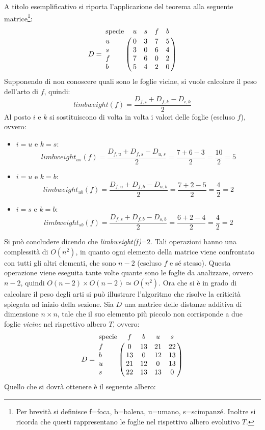 A titolo esemplificativo si riporta l'applicazione del teorema alla seguente matrice\footnote{Per brevità si definisce f=foca, b=balena, u=umano, s=scimpanzé. Inoltre si ricorda che questi rappresentano le foglie nel rispettivo albero evolutivo $T$.}:
\[
D = \bordermatrix{\text{specie}&u&s&f&b\cr
                u& 0 & 3 & 7 & 5\cr
                s& 3 & 0 & 6 & 4\cr
                f& 7 & 6 & 0 & 2\cr
                b& 5 & 4 & 2 & 0}
\]
Supponendo di non conoscere quali sono le foglie vicine, si vuole calcolare il peso dell'arto di $f$, quindi:
\[limbweight(f)=\frac{D_{f,i}+D_{f,k}-D_{i,k}}{2}\]
Al posto $i$ e $k$ si sostituiscono di volta in volta i valori delle foglie (escluso $f$), ovvero:
\begin{itemize}
	\item $i=u$ e $k=s$:
	\[limbweight_{us}(f)=\frac{D_{f,u}+D_{f,s}-D_{u,s}}{2}=\frac{7+6-3}{2}=\frac{10}{2}=5\]
	\item $i=u$ e $k=b$:
	\[limbweight_{ub}(f)=\frac{D_{f,u}+D_{f,b}-D_{u,b}}{2}=\frac{7+2-5}{2}=\frac{4}{2}=2\]
	\item $i=s$ e $k=b$:
	\[limbweight_{sb}(f)=\frac{D_{f,s}+D_{f,b}-D_{s,b}}{2}=\frac{6+2-4}{2}=\frac{4}{2}=2\]
\end{itemize}
Si può concludere dicendo che \textit{limbweight(f)}=$2$.
\newline
Tali operazioni hanno una complessità di $O(n^2)$, in quanto ogni elemento della matrice viene confrontato con tutti gli altri elementi, che sono $n-2$ (escluso $f$ e sé stesso). Questa operazione viene eseguita tante volte quante sono le foglie da analizzare, ovvero $n-2$, quindi $O(n-2)\times O(n-2)\simeq O(n^2)$.
\newline
Ora che si è in grado di calcolare il peso degli arti si può illustrare l'algoritmo che risolve la criticità spiegata ad inizio della sezione.
Sia $D$ una matrice delle distanze additiva di dimensione $n\times n$, tale che il suo elemento più piccolo non corrisponde a due foglie \textit{vicine} nel rispettivo albero $T$, ovvero:
\[
D = \bordermatrix{\text{specie}&f&b&u&s\cr
                f& 0 & 13 & 21 & 22\cr
                b& 13 & 0 & 12 & 13\cr
                u& 21 & 12 & 0 & 13\cr
                s& 22 & 13 & 13 & 0}
\]
\newpage
Quello che si dovrà ottenere è il seguente albero:

